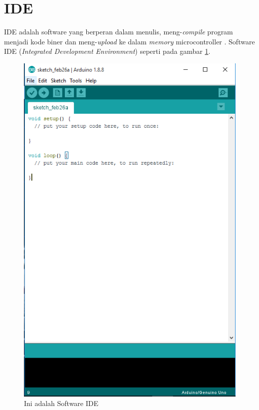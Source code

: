 \section{IDE}
IDE adalah software yang berperan dalam menulis, meng-\textit{compile} program menjadi kode biner dan meng-\textit{upload} ke dalam \textit{memory} microcontroller \cite{djuandi2011pengenalan}. Software IDE (\textit{Integrated Development Environment}) seperti pada gambar \ref{fig:IDE}.
\begin{figure}[!htbp]
  \centering
  \includegraphics[width=.75\textwidth]{figures/Arduino/IDE.png}
  \caption{Ini adalah Software IDE}\label{fig:IDE}
\end{figure}

